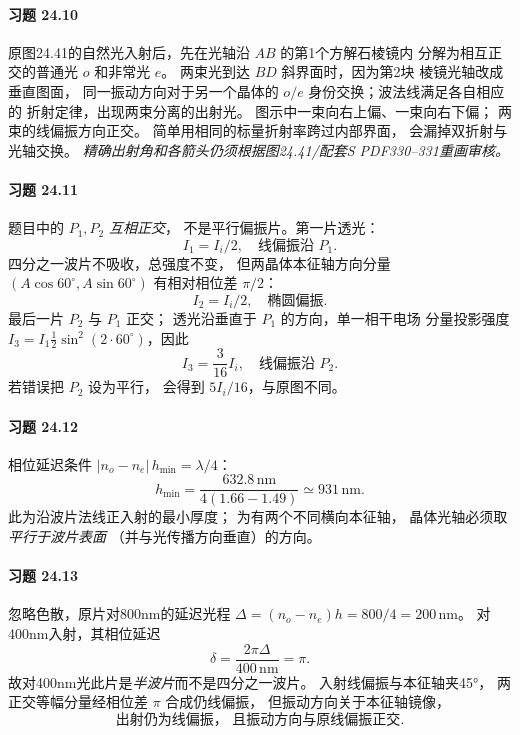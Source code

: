 \paragraph{习题 24.10}
原图24.41的自然光入射后，先在光轴沿
\(AB\) 的第1个方解石棱镜内
分解为相互正交的普通光 \(o\) 和非常光 \(e\)。
两束光到达 \(BD\) 斜界面时，因为第2块
棱镜光轴改成垂直图面，
同一振动方向对于另一个晶体的
\(o/e\) 身份交换；波法线满足各自相应的
折射定律，出现两束分离的出射光。
图示中一束向右上偏、一束向右下偏；
两束的线偏振方向正交。
简单用相同的标量折射率跨过内部界面，
会漏掉双折射与光轴交换。
\textit{精确出射角和各箭头仍须根据图24.41/配套S PDF330--331重画审核。}

\paragraph{习题 24.11}
题目中的 \(P_1,P_2\) \emph{互相正交}，
不是平行偏振片。第一片透光：
\[
\boxed{I_1=I_i/2,\quad\text{线偏振沿 }P_1}.
\]
四分之一波片不吸收，总强度不变，
但两晶体本征轴方向分量
\((A\cos60^\circ,A\sin60^\circ)\)
有相对相位差 \(\pi/2\)：
\[
\boxed{I_2=I_i/2,\quad\text{椭圆偏振}}.
\]
最后一片 \(P_2\) 与 \(P_1\) 正交；
透光沿垂直于 \(P_1\) 的方向，单一相干电场
分量投影强度
\(I_3=I_1\frac12\sin^2(2\cdot60^\circ)\)，因此
\[
\boxed{I_3=\frac{3}{16}I_i,\quad
\text{线偏振沿 }P_2}.
\]
若错误把 \(P_2\) 设为平行，
会得到 \(5I_i/16\)，与原图不同。

\paragraph{习题 24.12}
相位延迟条件
\(|n_o-n_e|\,h_{\min}=\lambda/4\)：
\[
\boxed{h_{\min}=\frac{632.8\,\mathrm{nm}}
{4(1.66-1.49)}
\simeq931\,\mathrm{nm}}.
\]
此为沿波片法线正入射的最小厚度；
为有两个不同横向本征轴，
晶体光轴必须取\emph{平行于波片表面}
（并与光传播方向垂直）的方向。

\paragraph{习题 24.13}
忽略色散，原片对800nm的延迟光程
\(\Delta=(n_o-n_e)h=800/4=200\,\mathrm{nm}\)。
对400nm入射，其相位延迟
\[
\delta=\frac{2\pi\Delta}{400\,\mathrm{nm}}=\pi.
\]
故对400nm光此片是\emph{半波片}而不是四分之一波片。
入射线偏振与本征轴夹45°，
两正交等幅分量经相位差 \(\pi\) 合成仍线偏振，
但振动方向关于本征轴镜像，
\[
\boxed{\text{出射仍为线偏振，
且振动方向与原线偏振正交}}.
\]

